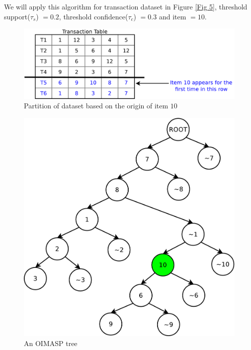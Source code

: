 \documentclass[preprint]{elsarticle}
\begin{document}
We will apply this algorithm for transaction dataset in Figure \ref{Fig 5}, threshold support($ \tau _{s} $) $ = 0.2 $, threshold confidence($ \tau _{c} $) $ = 0.3 $ and item $ = 10 $.

\begin{figure}
\begin{center}
\includegraphics[scale=0.35]{pdf/partition}
\end{center}
\caption{Partition of dataset based on the origin of item $ 10 $}
\label{Fig 8}
\end{figure}

\begin{figure}
\begin{center}
\includegraphics[scale=0.25]{pdf/moimasp}
\end{center}
\caption{An OIMASP tree}
\label{Fig 9}
\end{figure}
\end{document}
